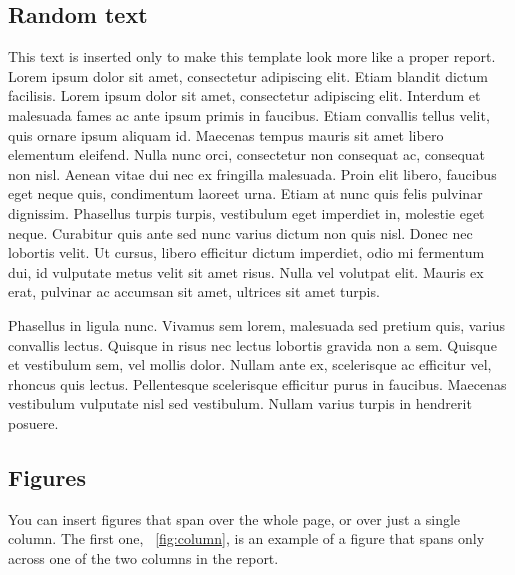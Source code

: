 \documentclass[fleqn,moreauthors,10pt]{ds_report}
\begin{document}
\subsection*{Random text}

This text is inserted only to make this template look more like a proper report. Lorem ipsum dolor sit amet, consectetur adipiscing elit. Etiam blandit dictum facilisis. Lorem ipsum dolor sit amet, consectetur adipiscing elit. Interdum et malesuada fames ac ante ipsum primis in faucibus. Etiam convallis tellus velit, quis ornare ipsum aliquam id. Maecenas tempus mauris sit amet libero elementum eleifend. Nulla nunc orci, consectetur non consequat ac, consequat non nisl. Aenean vitae dui nec ex fringilla malesuada. Proin elit libero, faucibus eget neque quis, condimentum laoreet urna. Etiam at nunc quis felis pulvinar dignissim. Phasellus turpis turpis, vestibulum eget imperdiet in, molestie eget neque. Curabitur quis ante sed nunc varius dictum non quis nisl. Donec nec lobortis velit. Ut cursus, libero efficitur dictum imperdiet, odio mi fermentum dui, id vulputate metus velit sit amet risus. Nulla vel volutpat elit. Mauris ex erat, pulvinar ac accumsan sit amet, ultrices sit amet turpis.

Phasellus in ligula nunc. Vivamus sem lorem, malesuada sed pretium quis, varius convallis lectus. Quisque in risus nec lectus lobortis gravida non a sem. Quisque et vestibulum sem, vel mollis dolor. Nullam ante ex, scelerisque ac efficitur vel, rhoncus quis lectus. Pellentesque scelerisque efficitur purus in faucibus. Maecenas vestibulum vulputate nisl sed vestibulum. Nullam varius turpis in hendrerit posuere.


\subsection*{Figures}

You can insert figures that span over the whole page, or over just a single column. The first one, \figurename~\ref{fig:column}, is an example of a figure that spans only across one of the two columns in the report.
\end{document}
